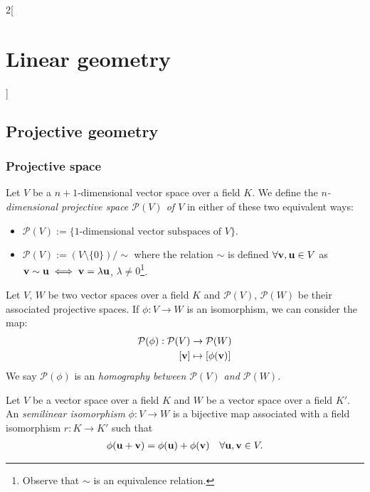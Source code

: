 \documentclass[../../../main.tex]{subfiles}
\begin{document}
\begin{multicols}{2}[\section{Linear geometry}]
    \subsection{Projective geometry}
    \subsubsection*{Projective space}
    \begin{definition}
        Let $V$ be a $n+1$-dimensional vector space over a field $K$. We define the \textit{$n$-dimensional projective space $\mathcal{P}(V)$ of $V$} in either of these two equivalent ways:
        \begin{itemize}
            \item $\displaystyle\mathcal{P}(V):=\{\text{1-dimensional vector subspaces of $V$}\}$.
            \item $\displaystyle\mathcal{P}(V):=(V\setminus\{0\})/\sim$ where the relation $\sim$ is defined $\forall\vb{v},\vb{u}\in V$ as $\vb{v}\sim \vb{u}\iff \vb{v}=\lambda \vb{u}$, $\lambda\ne 0$\footnote{Observe that $\sim$ is an equivalence relation.}.
        \end{itemize}
    \end{definition}
    \begin{definition}
        Let $V$, $W$ be two vector spaces over a field $K$ and $\mathcal{P}(V)$, $\mathcal{P}(W)$ be their associated projective spaces. If $\phi:V\rightarrow W$ is an isomorphism, we can consider the map:
        \begin{align*}
            \mathcal{P}(\phi):\mathcal{P}(V) & \rightarrow\mathcal{P}(W)     \\
            [\mathblack{v}]                  & \mapsto [\phi(\mathblack{v})]
        \end{align*}
        We say $\mathcal{P}(\phi)$ is an \textit{homography between $\mathcal{P}(V)$ and $\mathcal{P}(W)$}.
    \end{definition}
    \begin{definition}
        Let $V$ be a vector space over a field $K$ and $W$ be a vector space over a field $K'$. An \textit{semilinear isomorphism} $\phi:V\rightarrow W$ is a bijective map associated with a field isomorphism $r:K\rightarrow K'$ such that
        \begin{gather*}
            \phi(\mathblack{u}+\mathblack{v})=\phi(\mathblack{u})+\phi(\mathblack{v})\quad \forall \mathblack{u},\mathblack{v}\in V.\\

\end{gather*}
\end{definition}
\end{multicols}
\end{document}
